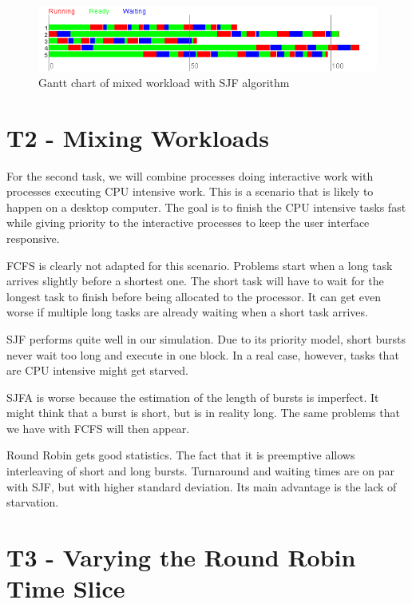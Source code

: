 \documentclass[11pt,a4paper]{scrartcl}
\begin{document}
\begin{figure}
\includegraphics[width=\textwidth]{mixedload.png}
\caption{Gantt chart of mixed workload with SJF algorithm}
\end{figure}



\section*{T2 - Mixing Workloads}

For the second task, we will combine processes doing interactive work with processes executing CPU intensive work. This is a scenario that is likely to happen on a desktop computer. The goal is to finish the CPU intensive tasks fast while giving priority to the interactive processes to keep the user interface responsive.

FCFS is clearly not adapted for this scenario. Problems start when a long task arrives slightly before a shortest one. The short task will have to wait for the longest task to finish before being allocated to the processor. It can get even worse if multiple long tasks are already waiting when a short task arrives.

SJF performs quite well in our simulation. Due to its priority model, short bursts never wait too long and execute in one block. In a real case, however, tasks that are CPU intensive might get starved.

SJFA is worse because the estimation of the length of bursts is imperfect. It might think that a burst is short, but is in reality long. The same problems that we have with FCFS will then appear.

Round Robin gets good statistics. The fact that it is preemptive allows interleaving of short and long bursts. Turnaround and waiting times are on par with SJF, but with higher standard deviation. Its main advantage is the lack of starvation.



\section*{T3 - Varying the Round Robin Time Slice}
\end{document}
